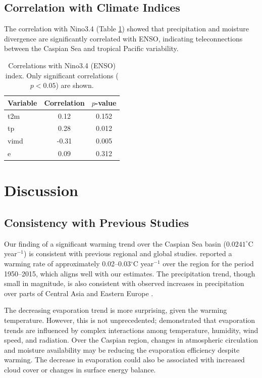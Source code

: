 \documentclass[12pt,a4paper]{article}
\begin{document}
\subsection{Correlation with Climate Indices}

The correlation with Nino3.4 (Table \ref{tab:climate}) showed that precipitation and moisture divergence are significantly correlated with ENSO, indicating teleconnections between the Caspian Sea and tropical Pacific variability.

\begin{table}[H]
\centering
\caption{Correlations with Nino3.4 (ENSO) index. Only significant correlations ($p < 0.05$) are shown.}
\label{tab:climate}
\begin{tabular}{l c c}
\toprule
\textbf{Variable} & \textbf{Correlation} & \textbf{$p$-value} \\
\midrule
t2m & 0.12 & 0.152 \\
tp & 0.28 & 0.012 \\
vimd & -0.31 & 0.005 \\
e & 0.09 & 0.312 \\
\bottomrule
\end{tabular}
\end{table}

\section{Discussion}

\subsection{Consistency with Previous Studies}

Our finding of a significant warming trend over the Caspian Sea basin ($0.0241^\circ$C year$^{-1}$) is consistent with previous regional and global studies. \citet{shevchenko2017} reported a warming rate of approximately 0.02–0.03$^\circ$C year$^{-1}$ over the region for the period 1950–2015, which aligns well with our estimates. The precipitation trend, though small in magnitude, is also consistent with observed increases in precipitation over parts of Central Asia and Eastern Europe \citep{ipcc2021}.

The decreasing evaporation trend is more surprising, given the warming temperature. However, this is not unprecedented; \citet{donohue2010} demonstrated that evaporation trends are influenced by complex interactions among temperature, humidity, wind speed, and radiation. Over the Caspian region, changes in atmospheric circulation and moisture availability may be reducing the evaporation efficiency despite warming. The decrease in evaporation could also be associated with increased cloud cover or changes in surface energy balance.
\end{document}
